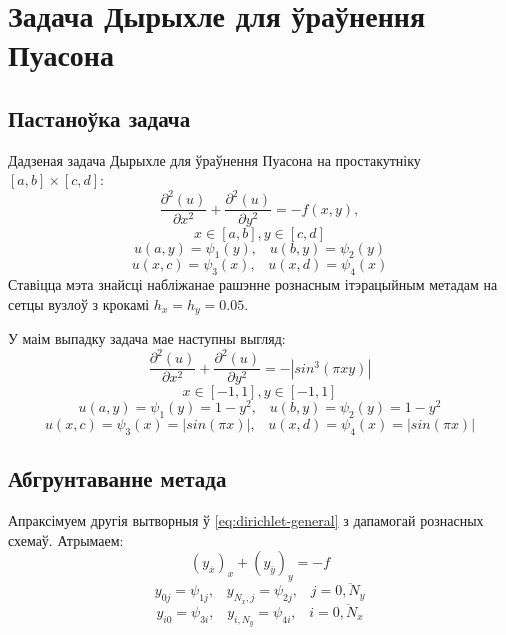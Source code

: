 \section{Задача Дырыхле для ўраўнення Пуасона}

\subsection*{Пастаноўка задача}
Дадзеная задача Дырыхле для ўраўнення Пуасона на простакутніку $[a,b]\times[c,d]$:
\begin{equation} \label{eq:dirichlet-general}
    \frac{\partial^2(u)}{\partial x^2} + \frac{\partial^2(u)}{\partial y^2} = -f(x,y),
\end{equation}
\[ x \in [a, b], y \in [c, d] \]
\[ u(a, y) = \psi_1(y), \hspace{10pt} u(b, y) = \psi_2(y) \]
\[ u(x, c) = \psi_3(x), \hspace{10pt} u(x, d) = \psi_4(x) \]
Ставіцца мэта знайсці набліжанае рашэнне рознасным ітэрацыйным метадам на сетцы вузлоў з крокамі $h_x = h_y = 0.05$.\par
\vspace{5mm}
У маім выпадку задача мае наступны выгляд:
\begin{equation}
    \frac{\partial^2(u)}{\partial x^2} + \frac{\partial^2(u)}{\partial y^2} = - | sin^3(\pi x y) |
\end{equation}
\[ x \in [-1, 1], y \in [-1, 1] \]
\[ u(a, y) = \psi_1(y) = 1 - y^2, \hspace{10pt} u(b, y) = \psi_2(y) = 1 - y^2 \]
\[ u(x, c) = \psi_3(x) = |sin(\pi x)|, \hspace{10pt} u(x, d) = \psi_4(x) = |sin(\pi x)| \]


\subsection*{Абгрунтаванне метада}

Апраксімуем другія вытворныя ў \eqref{eq:dirichlet-general} з дапамогай рознасных схемаў. Атрымаем:
\begin{equation}
    (y_{\overline{x}})_{x} + (y_{\overline{y}})_{y} = -f
\end{equation}
\[ y_{0j} = \psi_{1j}, \hspace{10pt} y_{N_x,j} = \psi_{2j}, \hspace{10pt} j = \overline{0, N_y} \]
\[ y_{i0} = \psi_{3i}, \hspace{10pt} y_{i,N_y} = \psi_{4i}, \hspace{10pt} i = \overline{0, N_x} \]

